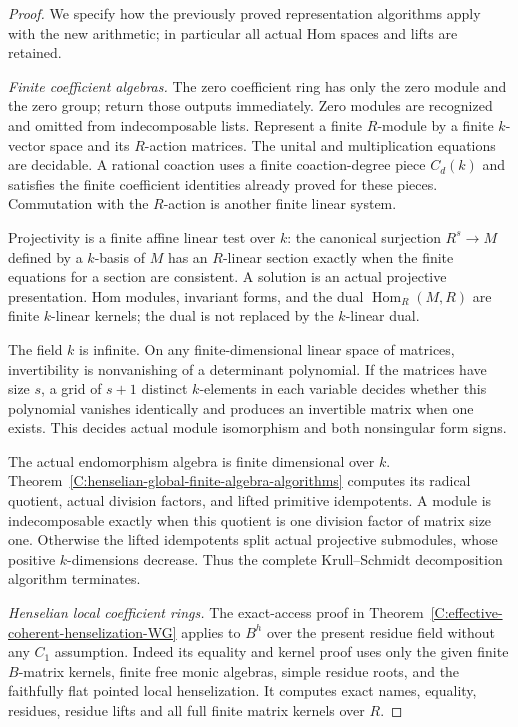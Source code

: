 \begin{proof}
We specify how the previously proved
representation algorithms apply with
the new arithmetic; in particular
all actual Hom spaces and lifts
are retained.

\emph{Finite coefficient algebras.}
The zero coefficient ring has only
the zero module and the zero group;
return those outputs immediately.
Zero modules are recognized and
omitted from indecomposable lists.
Represent a finite $R$-module by a
finite $k$-vector space and its
$R$-action matrices.  The unital
and multiplication equations are
decidable.  A rational coaction
uses a finite coaction-degree
piece $C_d(k)$ and satisfies the
finite coefficient identities
already proved for these pieces.
Commutation with the $R$-action
is another finite linear system.

Projectivity is a finite affine
linear test over $k$: the canonical
surjection $R^s\to M$ defined by
a $k$-basis of $M$ has an
$R$-linear section exactly when
the finite equations for a section
are consistent.  A solution is
an actual projective presentation.
Hom modules, invariant forms, and
the dual $\operatorname{Hom}_R(M,R)$
are finite $k$-linear kernels;
the dual is not replaced by
the $k$-linear dual.

The field $k$ is infinite.
On any finite-dimensional linear
space of matrices, invertibility
is nonvanishing of a determinant
polynomial.  If the matrices have
size $s$, a grid of $s+1$ distinct
$k$-elements in each variable
decides whether this polynomial
vanishes identically and produces
an invertible matrix when one
exists.  This decides actual
module isomorphism and both
nonsingular form signs.

The actual endomorphism algebra
is finite dimensional over $k$.
Theorem~\ref{C:henselian-global-finite-algebra-algorithms}
computes its radical quotient,
actual division factors, and
lifted primitive idempotents.
A module is indecomposable
exactly when this quotient
is one division factor of
matrix size one.  Otherwise
the lifted idempotents split
actual projective submodules,
whose positive $k$-dimensions
decrease.  Thus the complete
Krull--Schmidt decomposition
algorithm terminates.

\emph{Henselian local coefficient rings.}
The exact-access proof in
Theorem~\ref{C:effective-coherent-henselization-WG}
applies to $B^h$ over the present
residue field without any $C_1$
assumption.  Indeed its equality
and kernel proof uses only the
given finite $B$-matrix kernels,
finite free monic algebras,
simple residue roots, and the
faithfully flat pointed local
henselization.  It computes
exact names, equality, residues,
residue lifts and all full
finite matrix kernels over $R$.


\end{proof}
